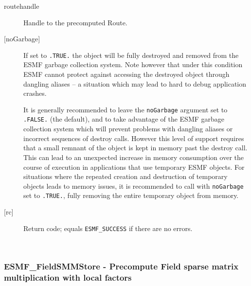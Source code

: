      \begin{description}
     \item [routehandle]
       Handle to the precomputed Route.
     \item[{[noGarbage]}]
       If set to {\tt .TRUE.} the object will be fully destroyed and removed
       from the ESMF garbage collection system. Note however that under this 
       condition ESMF cannot protect against accessing the destroyed object 
       through dangling aliases -- a situation which may lead to hard to debug 
       application crashes.
   
       It is generally recommended to leave the {\tt noGarbage} argument
       set to {\tt .FALSE.} (the default), and to take advantage of the ESMF 
       garbage collection system which will prevent problems with dangling
       aliases or incorrect sequences of destroy calls. However this level of
       support requires that a small remnant of the object is kept in memory
       past the destroy call. This can lead to an unexpected increase in memory
       consumption over the course of execution in applications that use 
       temporary ESMF objects. For situations where the repeated creation and 
       destruction of temporary objects leads to memory issues, it is 
       recommended to call with {\tt noGarbage} set to {\tt .TRUE.}, fully 
       removing the entire temporary object from memory.
     \item [{[rc]}]
       Return code; equals {\tt ESMF\_SUCCESS} if there are no errors.
     \end{description}
   
 
\mbox{}\hrulefill\ 
 
\subsubsection [ESMF\_FieldSMMStore] {ESMF\_FieldSMMStore - Precompute Field sparse matrix multiplication with local factors}


